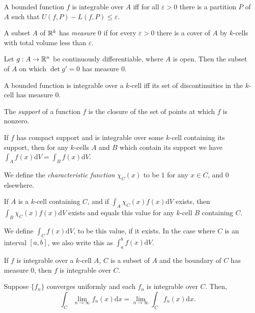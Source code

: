 \begin{prop}
    A bounded function $f$ is integrable over $A$ iff for all $\varepsilon>0$ there is a
    partition $P$ of $A$ such that $U(f,P)-L(f,P)\le\varepsilon$.
\end{prop}
\begin{defn}
    A subset $A$ of $\mathbb{R}^k$ has \emph{measure} $0$ if for every $\varepsilon>0$
    there is a cover of $A$ by $k$-cells with total volume less than
    $\varepsilon$.
\end{defn}
\begin{thm}[Sard]
    Let $g:A\to\mathbb{R}^n$ be continuously differentiable, where $A$ is open. Then
    the subset of $A$ on which $\det g'=0$ has measure $0$.
\end{thm}
\begin{thm}
    A bounded function is integrable over a $k$-cell iff its set of
    discontinuities in the $k$-cell has measure $0$.
\end{thm}
\begin{defn}
    The \emph{support} of a function $f$ is the closure of the set of points at
    which $f$ is nonzero.
\end{defn}
\begin{prop}
    If $f$ has compact support and is integrable over some $k$-cell containing
    its support,
    then for any $k$-cells $A$ and $B$ which contain
    its support we have $\int_A f(x)\mathrm dV=\int_B f(x)\mathrm dV$.
\end{prop}
\begin{defn}
    We define the \emph{characteristic function}
    $\chi_C(x)$ to be $1$ for any $x\in C$, and $0$ elsewhere.
\end{defn}
\begin{cor}
    If $A$ is a $k$-cell containing $C$, and if
    $\int_A\chi_C(x)f(x)\mathrm dV$ exists, then $\int_B\chi_C(x)f(x)\mathrm dV$
    exists and equals this value for any $k$-cell $B$ containing $C$.
\end{cor}
\begin{defn}
    We define $\int_C f(x)\mathrm dV$, to be this value, if it exists. In the
    case where $C$ is an interval $[a,b]$, we also write this as $\int_a^b
    f(x)\mathrm dV$.
\end{defn}
\begin{prop}
    If $f$ is integrable over a $k$-cell $A$, $C$ is a subset of $A$ and the
    boundary of $C$ has measure $0$, then $f$ is integrable over $C$.
\end{prop}
\begin{prop}
    Suppose $\{f_n\}$ converges uniformly and each $f_n$ is integrable over $C$. Then,
    \[\int_C\lim_{n\to\infty} f_n(x)\mathrm dx=\lim_{n\to\infty}\int_C
    f_n(x)\mathrm dx.\]
\end{prop}

